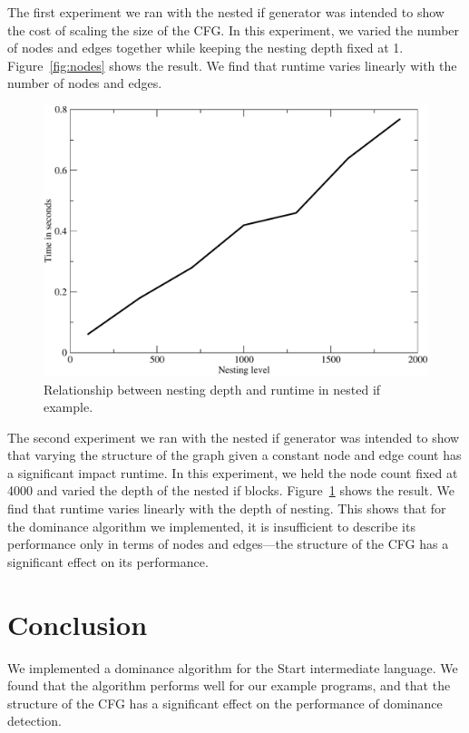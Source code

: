 \documentclass[10pt,twocolumn]{article}
\begin{document}
The first experiment we ran with the nested if generator was intended
to show the cost of scaling the size of the CFG. In this experiment,
we varied the number of nodes and edges together while keeping the
nesting depth fixed at 1. Figure~\ref{fig:nodes} shows the result. We
find that runtime varies linearly with the number of nodes and edges.


\begin{figure}
\begin{center}
  \includegraphics[width=0.95\columnwidth]{figs/nesting.pdf}
\begin{minipage}{0.95\columnwidth}
  \caption{\label{fig:nesting} Relationship between nesting depth and runtime in nested if example.}
\end{minipage}
\end{center}
\end{figure}

The second experiment we ran with the nested if generator was intended
to show that varying the structure of the graph given a constant node
and edge count has a significant impact runtime. In this experiment,
we held the node count fixed at 4000 and varied the depth of the
nested if blocks. Figure~\ref{fig:nesting} shows the result. We find
that runtime varies linearly with the depth of nesting. This shows
that for the dominance algorithm we implemented, it is insufficient to
describe its performance only in terms of nodes and edges---the
structure of the CFG has a significant effect on its performance.

\section{Conclusion}

We implemented a dominance algorithm for the Start intermediate
language. We found that the algorithm performs well for our example
programs, and that the structure of the CFG has a significant effect
on the performance of dominance detection.



\end{document}
